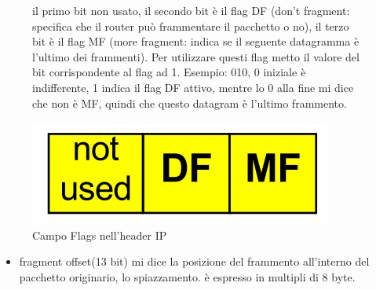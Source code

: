         \begin{figure}[h!]
            \begin{minipage}{0.55\textwidth}
                \raggedright
                 il primo bit non usato, il secondo bit è il flag DF (don't fragment: specifica che il router può frammentare il pacchetto o no), il terzo bit è il flag MF (more fragment: indica se il seguente datagramma è l'ultimo dei frammenti). Per utilizzare questi flag metto il valore del bit corrispondente al flag ad 1. Esempio: 010, 0 iniziale è indifferente, 1 indica il flag DF attivo, mentre lo 0 alla fine mi dice che non è MF, quindi che questo datagram è l'ultimo frammento.
            \end{minipage}\hfill
            \begin{minipage}{0.4\textwidth}
                \centering
                \includegraphics[width=\textwidth]{images/flagsIP.png}
                \caption{Campo Flags nell'header IP}
                \label{fig:flagsIP}
            \end{minipage}
        \end{figure}
\begin{itemize}
    \item fragment offset(13 bit) mi dice la posizione del frammento all'interno del pacchetto originario, lo spiazzamento. è espresso in multipli di 8 byte. 
\end{itemize}

